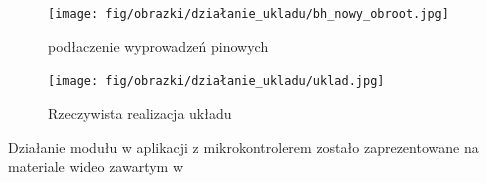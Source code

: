 \documentclass[11pt, a4paper]{article}
\begin{document}
\begin{figure}[h!]
    \centering
    \texttt{[image: fig/obrazki/działanie\_ukladu/bh\_nowy\_obroot.jpg]}
    \caption{podłaczenie wyprowadzeń pinowych}
    \label{fig:my_label}
\end{figure}

\vspace{0.5cm}
\begin{figure}[h!]
    \centering
    \texttt{[image: fig/obrazki/działanie\_ukladu/uklad.jpg]}
    \caption{Rzeczywista realizacja układu}
    \label{fig:my_label}
\end{figure}
\vspace{0.5cm}

Działanie modułu w aplikacji z mikrokontrolerem zostało zaprezentowane na materiale wideo zawartym w %





\printbibliography[heading=bibintoc]
\end{document}
